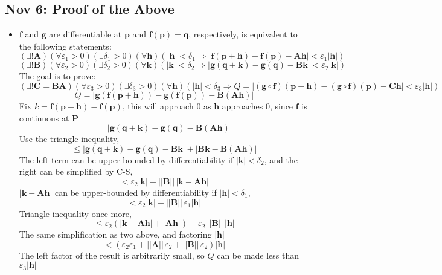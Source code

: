 \documentclass[10pt, oneside]{article}
\let\leq\leqslant
\let\ep\varepsilon
\let\de\delta
\renewcommand{\vec}[1]{\mathbf{#1}}
\newcommand{\vecf}[1]{\boldsymbol{#1}}
\newcommand{\mat}[1]{\mathbf{#1}}
\begin{document}
\subsection{Nov 6: Proof of the Above}
\begin{itemize}
    \item $\vecf{f}$ and $\vecf{g}$ are differentiable at $\vec{p}$ and $\vecf{f}(\vec{p}) = \vec{q}$, respectively, is equivalent to the following statements:
        \[(\exists! \mat{A})(\forall \ep_1 > 0)(\exists \de_1 > 0)(\forall \vec{h})(|\vec{h}| < \de_1 \Rightarrow |\vecf{f}(\vec{p} + \vec{h}) - \vecf{f}(\vec{p}) - \mat{A}\vec{h}| < \ep_1 |\vec{h}|)\]
        \[(\exists! \mat{B})(\forall \ep_2 > 0)(\exists \de_2 > 0)(\forall \vec{k})(|\vec{k}| < \de_2 \Rightarrow |\vecf{g}(\vec{q} + \vec{k}) - \vecf{g}(\vec{q}) - \mat{B}\vec{k}| < \ep_2 |\vec{k}|)\]
        The goal is to prove:
        \[(\exists! \mat{C} = \mat{B}\mat{A})(\forall \ep_3 > 0)(\exists \de_3 > 0)(\forall \vec{h})(|\vec{h}| < \de_3 \Rightarrow Q = |(\vecf{g} \circ \vecf{f})(\vec{p} + \vec{h}) - (\vecf{g} \circ \vecf{f})(\vec{p}) - \mat{C}\vec{h}| < \ep_3 |\vec{h}|)\]
        \[Q = |\vecf{g}(\vecf{f}(\vec{p} + \vec{h})) - \vecf{g}(\vecf{f}(\vec{p})) - \mat{B}(\mat{A}\vec{h})|\]
        Fix $k = \vecf{f}(\vec{p} + \vec{h}) - \vecf{f}(\vec{p})$, this will approach $0$ as $\vec{h}$ approaches $0$, since $\vecf{f}$ is continuous at $\vec{P}$ 
        \[= |\vecf{g}(\vec{q} + \vec{k}) - \vecf{g}(\vec{q}) - \mat{B}(\mat{A}\vec{h})|\]
        Use the triangle inequality,
        \[\leq |\vecf{g}(\vec{q} + \vec{k}) - \vecf{g}(\vec{q}) - \mat{B}\vec{k}| + |\mat{B}\vec{k} - \mat{B}(\mat{A}\vec{h})|\]
        The left term can be upper-bounded by differentiability if $|\vec{k}| < \de_2$, and the right can be simplified by C-S,
        \[< \ep_2 |\vec{k}| + ||\mat{B}||\, |\vec{k} - \mat{A}\vec{h}|\]
        $|\vec{k} - \mat{A}\vec{h}|$ can be upper-bounded by differentiability if $|\vec{h}| < \de_1$,
        \[< \ep_2 |\vec{k}| + ||\mat{B}||\, \ep_1 |\vec{h}|\]
        Triangle inequality once more,
        \[\leq \ep_2(|\vec{k} - \mat{A}\vec{h}| + |\mat{A}\vec{h}|) + \ep_2 \, ||\mat{B}||\, |\vec{h}|\]
        The same simplification as two above, and factoring $|\vec{h}|$
        \[< (\ep_2 \ep_1 + ||\mat{A}||\, \ep_2 + ||\mat{B}||\, \ep_2)|\vec{h}|\]
        The left factor of the result is arbitrarily small, so $Q$ can be made less than $\ep_3 |\vec{h}|$
\end{itemize}
\end{document}
